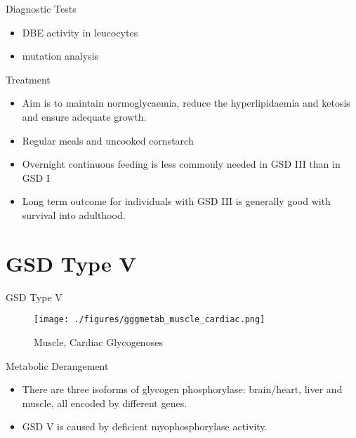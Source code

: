 \documentclass[presentation, smaller]{beamer}
\begin{document}
\begin{frame}[label={sec:org0d580d0}]{Diagnostic Tests}
\begin{itemize}
\item DBE activity in leucocytes
\item mutation analysis
\end{itemize}
\end{frame}
\begin{frame}[label={sec:org077111e}]{Treatment}
\begin{itemize}
\item Aim is to maintain normoglycaemia, reduce the hyperlipidaemia and ketosis and
ensure adequate growth.
\item Regular meals and uncooked cornstarch
\item Overnight continuous feeding is less commonly needed in GSD III than
in GSD I
\item Long term outcome for individuals with GSD III is generally good
with survival into adulthood.
\end{itemize}
\end{frame}

\section{GSD Type V}
\label{sec:org0ff6bbe}
\begin{frame}[label={sec:orge6316ed}]{GSD Type V}
\begin{figure}[htbp]
\centering
\texttt{[image: ./figures/gggmetab\_muscle\_cardiac.png]}
\caption[Muscle, Cardiac Glycogenoses]{\label{fig:org7074efc}
Muscle, Cardiac Glycogenoses}
\end{figure}
\end{frame}

\begin{frame}[label={sec:orgb1554ef}]{Metabolic Derangement}
\begin{itemize}
\item There are three isoforms of glycogen phosphorylase: brain/heart,
liver and muscle, all encoded by different genes.
\item GSD V is caused by deficient myophosphorylase activity.
\end{itemize}
\end{frame}
\end{document}
